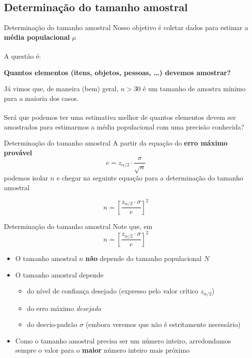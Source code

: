 \documentclass[10pt]{beamer}\usepackage[]{graphicx}\usepackage[]{color}
\theoremstyle{definition}
\begin{document}
\subsection{Determinação do tamanho amostral}

\begin{frame}{Determinação do tamanho amostral}
  Nosso objetivo é coletar dados para estimar a \textbf{média
    populacional} $\mu$ \\~\\
  A questão é:
  \begin{center}
    \textbf{Quantos elementos (itens, objetos, pessoas, \ldots) devemos
      amostrar?}
  \end{center}
  \vspace{1em}
  Já vimos que, de maneira (bem) geral, $n>30$ é um tamanho de amostra
  mínimo para a maioria dos casos. \\~\\
  Será que podemos ter uma estimativa melhor de quantos elementos
  devem ser amostrados para estimarmos a média populacional com uma
  precisão conhecida?
\end{frame}

\begin{frame}{Determinação do tamanho amostral}
  A partir da equação do \textbf{erro máximo provável}
  \begin{equation*}
    e = z_{\alpha/2} \cdot \frac{\sigma}{\sqrt{n}}
  \end{equation*}
  podemos isolar $n$ e chegar na seguinte equação para a determinação do
  tamanho amostral

  \begin{equation*}
    n = \left[ \frac{z_{\alpha/2} \cdot \sigma}{e} \right]^2
  \end{equation*}
\end{frame}

\begin{frame}{Determinação do tamanho amostral}
  Note que, em
  \begin{equation*}
    n = \left[ \frac{z_{\alpha/2} \cdot \sigma}{e} \right]^2
  \end{equation*}
  \begin{itemize}
  \item O tamanho amostral $n$ \textbf{não} depende do tamanho
    populacional $N$
  \item O tamanho amostral depende
    \begin{itemize}
    \item do nível de confiança desejado (expresso pelo valor crítico
      $z_{\alpha/2}$)
    \item do erro máximo \textsl{desejado}
    \item do desvio-padrão $\sigma$ (embora veremos que não é
      estritamente necessário)
    \end{itemize}
  \item Como o tamanho amostral precisa ser um número inteiro,
    arredondamos sempre o valor para o \textbf{maior} número inteiro
    mais próximo
  \end{itemize}
\end{frame}
\end{document}

